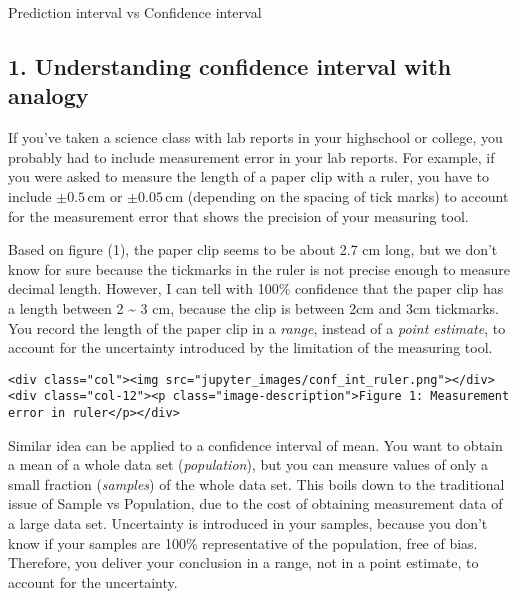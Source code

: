 \documentclass[11pt]{article}
\begin{document}
Prediction interval vs Confidence interval

    \hypertarget{Understandingux20confidenceux20intervalux20withux20analogy}{}

\subsection{1. Understanding confidence interval with
analogy}\label{understanding-confidence-interval-with-analogy}

If you've taken a science class with lab reports in your highschool or
college, you probably had to include measurement error in your lab
reports. For example, if you were asked to measure the length of a paper
clip with a ruler, you have to include \(\pm0.5 \,\text{cm}\) or
\(\pm0.05\,\text{cm}\) (depending on the spacing of tick marks) to
account for the measurement error that shows the precision of your
measuring tool.

Based on figure (1), the paper clip seems to be about 2.7 cm long, but
we don't know for sure because the tickmarks in the ruler is not precise
enough to measure decimal length. However, I can tell with 100\%
confidence that the paper clip has a length between 2 \textasciitilde{}
3 cm, because the clip is between 2cm and 3cm tickmarks. You record the
length of the paper clip in a \emph{range}, instead of a \emph{point
estimate}, to account for the uncertainty introduced by the limitation
of the measuring tool.

\hypertarget{fig1}{}
\begin{verbatim}
<div class="col"><img src="jupyter_images/conf_int_ruler.png"></div>
<div class="col-12"><p class="image-description">Figure 1: Measurement error in ruler</p></div>
\end{verbatim}

Similar idea can be applied to a confidence interval of mean. You want
to obtain a mean of a whole data set (\emph{population}), but you can
measure values of only a small fraction (\emph{samples}) of the whole
data set. This boils down to the traditional issue of Sample vs
Population, due to the cost of obtaining measurement data of a large
data set. Uncertainty is introduced in your samples, because you don't
know if your samples are 100\% representative of the population, free of
bias. Therefore, you deliver your conclusion in a range, not in a point
estimate, to account for the uncertainty.

    \hypertarget{Uncertaintyux20inux20rockux20porosity}{}
\end{document}

